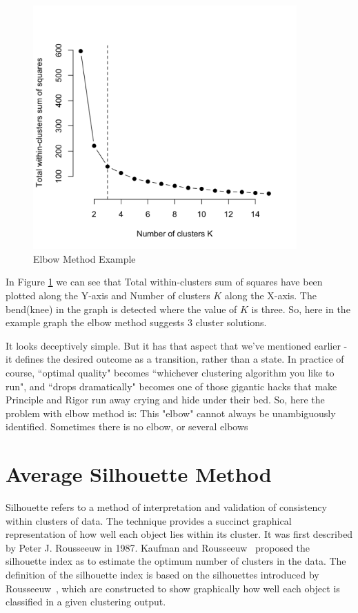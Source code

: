 \begin{figure}[t]
  \centering
  \includegraphics[width=0.9\textwidth]{figures/elbow1}
  \caption{Elbow Method Example}
  \label{fig:elbow}
\end{figure}

In Figure \ref{fig:elbow} we can see that Total within-clusters sum of squares have been plotted along
the Y-axis and Number of clusters $K$ along the X-axis. The bend(knee) in the graph is detected where
the value of $K$ is three. So, here in the example graph the elbow method suggests 3 cluster solutions.

It looks deceptively simple. But it has that aspect that we've mentioned earlier - it defines the desired outcome
as a transition, rather than a state. In practice of course, ``optimal quality" becomes ``whichever clustering
algorithm you like to run", and ``drops dramatically" becomes one of those gigantic hacks that make Principle and
Rigor run away crying and hide under their bed. So, here the problem  with  elbow  method is:  This  "elbow"  cannot
always  be  unambiguously  identified.  Sometimes  there  is  no  elbow,  or  several elbows

\section{Average Silhouette Method}
Silhouette refers to a method of interpretation and validation of consistency within clusters of data.
The technique provides a succinct graphical representation of how well each object lies within its cluster.
It was first described by Peter J. Rousseeuw in 1987. Kaufman and Rousseeuw~\cite{rousseeuw90} proposed the
silhouette index as to estimate the optimum number of clusters in the data. The definition of the
silhouette index is based on the silhouettes introduced by Rousseeuw~\cite{rousseeuw87}, which are constructed
to show graphically how well each object is classified in a given clustering output.

